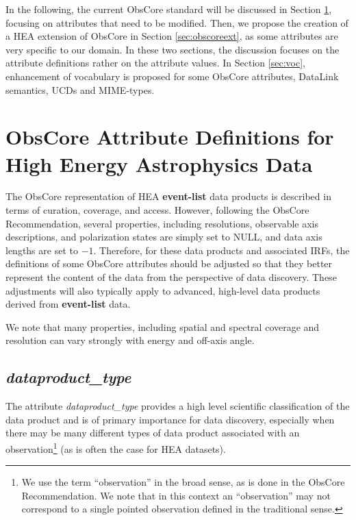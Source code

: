 \documentclass[11pt,a4paper]{ivoa}
\begin{document}
In the following, the current ObsCore standard will be discussed in Section \ref{sec:obscore}, focusing on attributes that need to be modified. Then, we propose the creation of a \gls{HEA} extension of ObsCore in Section \ref{sec:obscoreext}, as some attributes are very specific to our domain. In these two sections, the discussion focuses on the attribute definitions rather on the attribute values. In Section \ref{sec:voc}, enhancement of vocabulary is proposed for some ObsCore attributes, DataLink semantics, UCDs and MIME-types.

\section{ObsCore Attribute Definitions for High Energy Astrophysics Data}
\label{sec:obscore}

The ObsCore representation of \gls{HEA} \textbf{event-list} data products is described in terms of curation, coverage, and access.  However, following the ObsCore Recommendation, several properties, including resolutions, observable axis descriptions, and polarization states are simply set to NULL, and data axis lengths are set to $-1$.  Therefore, for these data products and associated IRFs, the definitions of some ObsCore attributes should be adjusted so that they better represent the content of the data from the perspective of data discovery. These adjustments will also typically apply to advanced, high-level data products derived from \textbf{event-list} data.

We note that many properties, including spatial and spectral coverage and resolution can vary strongly with energy and off-axis angle.

\subsection{{\em dataproduct\_type}}
\label{sec:dataproduct_type}

The attribute {\em dataproduct\_type\/} provides a high level scientific classification of the data product and is of primary importance for data discovery, especially when there may be many different types of data product associated with an observation\footnote{We use the term ``observation'' in the broad sense, as is done in the ObsCore Recommendation. We note that in this context an ``observation'' may not correspond to a single pointed observation defined in the traditional sense.} (as is often the case for \gls{HEA} datasets).
\end{document}
